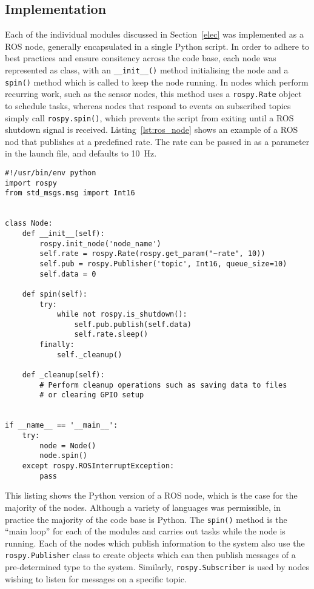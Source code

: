 \subsection{Implementation}\label{soft/ROS/impl}
Each of the individual modules discussed in Section~\ref{elec} was implemented as a ROS node, generally encapsulated in a single Python script. In order to adhere to best practices and ensure consitency across the code base, each node was represented as class, with an \verb|__init__()| method initialising the node and a \verb|spin()| method which is called to keep the node running. In nodes which perform recurring work, such as the sensor nodes, this method uses a \verb|rospy.Rate| object to schedule tasks, whereas nodes that respond to events on subscribed topics simply call \verb|rospy.spin()|, which prevents the script from exiting until a ROS shutdown signal is received. Listing~\ref{lst:ros_node} shows an example of a ROS nod that publishes at a predefined rate. The rate can be passed in as a parameter in the launch file, and defaults to \SI{10}{\Hz}.

\begin{lstlisting}[caption={Example ROS node}, label={lst:ros_node}]
#!/usr/bin/env python
import rospy
from std_msgs.msg import Int16


class Node:
    def __init__(self):
        rospy.init_node('node_name')
        self.rate = rospy.Rate(rospy.get_param("~rate", 10))
        self.pub = rospy.Publisher('topic', Int16, queue_size=10)
        self.data = 0

    def spin(self):
        try:
            while not rospy.is_shutdown():
                self.pub.publish(self.data)
                self.rate.sleep()
        finally:
            self._cleanup()

    def _cleanup(self):
        # Perform cleanup operations such as saving data to files
        # or clearing GPIO setup


if __name__ == '__main__':
    try:
        node = Node()
        node.spin()
    except rospy.ROSInterruptException:
        pass
\end{lstlisting}

This listing shows the Python
version of a ROS node, which is the case for the majority of the nodes. Although
a variety of languages was permissible, in practice the majority of the code base
is Python. The \verb|spin()| method is the ``main loop'' for each of the modules and
carries out tasks while the node is running. Each of the nodes which publish
information to the system also use the \verb|rospy.Publisher| class to create objects
which can then publish messages of a pre-determined type to the system.
Similarly, \verb|rospy.Subscriber| is used by nodes wishing to listen for messages on
a specific topic.

